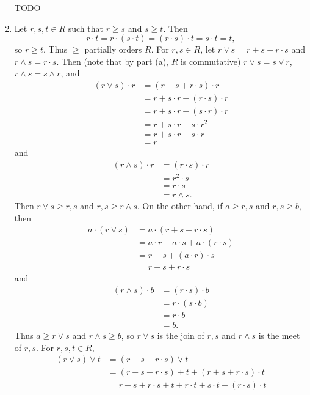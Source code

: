 \begin{prob}
\begin{enumerate}
\item [TODO]

\item Let $r, s, t \in R$ such that $r \geq s$ and $s\geq t$. Then \[r\cdot t = r\cdot(s\cdot t) = (r\cdot s)\cdot t = s\cdot t = t,\] so $r \geq t$. Thus $\geq$ partially orders $R$. For $r, s \in R$, let $r\vee s = r + s + r\cdot s$ and $r\wedge s = r\cdot s$. Then (note that by part (a), $R$ is commutative) $r\vee s = s\vee r$, $r\wedge s = s\wedge r$, and
\begin{align*}
(r\vee s)\cdot r & = (r + s + r\cdot s)\cdot r\\
& = r + s\cdot r + (r\cdot s)\cdot r\\
& = r + s\cdot r + (s\cdot r)\cdot r\\
& = r + s\cdot r + s\cdot r^2\\
& = r + s\cdot r + s\cdot r\\
& = r
\end{align*}
and
\begin{align*}
(r\wedge s)\cdot r & = (r\cdot s)\cdot r\\
& = r^2\cdot s\\
& = r\cdot s\\
& = r\wedge s.
\end{align*}
Then $r\vee s \geq r, s$ and $r, s \geq r\wedge s$. On the other hand, if $a \geq r, s$ and $r, s \geq b$, then
\begin{align*}
a\cdot(r\vee s) & = a\cdot(r + s + r\cdot s)\\
& = a\cdot r + a\cdot s + a\cdot(r\cdot s)\\
& = r + s + (a\cdot r)\cdot s\\
& = r + s + r\cdot s
\end{align*}
and
\begin{align*}
(r\wedge s)\cdot b & = (r\cdot s)\cdot b\\
& = r\cdot(s\cdot b)\\
& = r\cdot b\\
& = b.
\end{align*}
Thus $a \geq r\vee s$ and $r\wedge s \geq b$, so $r\vee s$ is the join of $r, s$ and $r\wedge s$ is the meet of $r, s$. For $r, s, t \in R$,
\begin{align*}
(r\vee s)\vee t & = (r + s + r\cdot s)\vee t\\
& = (r + s + r\cdot s) + t + (r + s + r\cdot s)\cdot t\\
& = r + s + r\cdot s + t + r\cdot t + s\cdot t + (r\cdot s)\cdot t\\

\end{align*}
\end{enumerate}
\end{prob}
